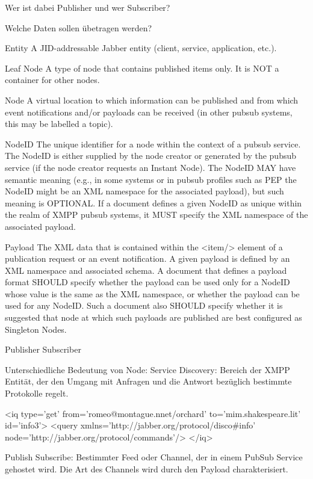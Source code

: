 Wer ist dabei Publisher und wer Subscriber?

Welche Daten sollen übetragen werden?

Entity
A JID-addressable Jabber entity (client, service, application, etc.).

Leaf Node
A type of node that contains published items only. It is NOT a container for other nodes.

Node
A virtual location to which information can be published and from which event notifications and/or payloads can be received (in other pubsub systems, this may be labelled a topic).

NodeID
The unique identifier for a node within the context of a pubsub service. The NodeID is either supplied by the node creator or generated by the pubsub service (if the node creator requests an Instant Node). The NodeID MAY have semantic meaning (e.g., in some systems or in pubsub profiles such as PEP the NodeID might be an XML namespace for the associated payload), but such meaning is OPTIONAL. If a document defines a given NodeID as unique within the realm of XMPP pubsub systems, it MUST specify the XML namespace of the associated payload.

Payload
The XML data that is contained within the <item/> element of a publication request or an event notification. A given payload is defined by an XML namespace and associated schema. A document that defines a payload format SHOULD specify whether the payload can be used only for a NodeID whose value is the same as the XML namespace, or whether the payload can be used for any NodeID. Such a document also SHOULD specify whether it is suggested that node at which such payloads are published are best configured as Singleton Nodes.

Publisher
Subscriber

Unterschiedliche Bedeutung von Node:
Service Discovery: Bereich der XMPP Entität, der den Umgang mit Anfragen und die Antwort bezüglich bestimmte Protokolle regelt.

<iq type='get'
    from='romeo@montague.nnet/orchard'
    to='mim.shakespeare.lit'
    id='info3'>
  <query xmlns='http://jabber.org/protocol/disco\#info'
         node='http://jabber.org/protocol/commands'/>
</iq>



Publish Subscribe: Bestimmter Feed oder Channel, der in einem PubSub Service gehostet wird. Die Art des Channels wird durch den Payload charakterisiert.


